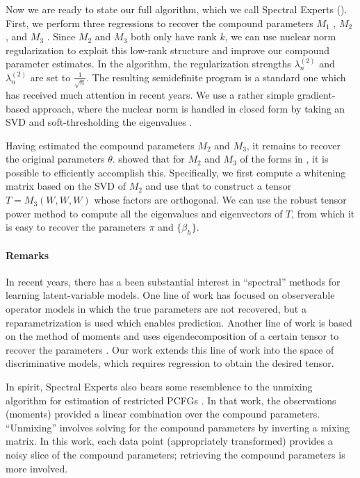 Now we are ready to state our full algorithm, which we call Spectral Experts
().
First, we perform three regressions to recover the compound parameters
$M_1$ ,
$M_2$ , and
$M_3$ .
Since $M_2$ and $M_3$ both only have rank $k$,
we can use nuclear norm regularization
\cite{Tomioka2011,NegahbanWainwright2009}
to exploit this low-rank structure and improve our compound parameter estimates.
In the algorithm, the regularization strengths $\lambda_n^{(2)}$ and $\lambda_n^{(2)}$
are set to $\frac{1}{\sqrt{n}}$.
The resulting semidefinite program is a standard one which has received
much attention in recent years.
We use a rather simple gradient-based approach,
where the nuclear norm is handled in closed form by taking an SVD
and soft-thresholding the eigenvalues \cite{donoho95soft,cai10soft}.

Having estimated the compound parameters $M_2$ and $M_3$,
it remains to recover the original parameters $\theta$.
\citet{AnandkumarGeHsu2012} showed that for $M_2$ and $M_3$ of
the forms in , it is possible to efficiently accomplish this.
Specifically, we first compute a whitening matrix based on the SVD of $M_2$
and use that to construct a tensor $T = M_3(W, W, W)$ whose factors are orthogonal.
We can use the robust tensor power method to compute all the
eigenvalues and eigenvectors of $T$, from which it is easy to recover
the parameters $\pi$ and $\{\beta_h\}$.

\paragraph{Remarks}

In recent years, there has a been substantial interest in ``spectral'' methods
for learning latent-variable models.  One line of work has
focused on observerable operator models \cite{hsu09spectral}
in which the true parameters are not recovered, but a reparametrization is used
which enables prediction.
Another line of work is based on the method of moments and uses eigendecomposition of a certain tensor
to recover the parameters \cite{anandkumar12moments,anandkumar12svd,AnandkumarHsuKakade2012}.
Our work extends this line of work into the space of discriminative models,
which requires regression to obtain the desired tensor.

In spirit, Spectral Experts also bears some resemblence to the unmixing
algorithm for estimation of restricted PCFGs
\cite{hsu12identifiability}.
In that work, the observations (moments) provided a linear combination over
the compound parameters.  ``Unmixing'' involves solving for the compound
parameters by inverting a mixing matrix.  In this work,
each data point (appropriately transformed) provides a noisy slice of the
compound parameters; retrieving the compound parameters is more involved.


